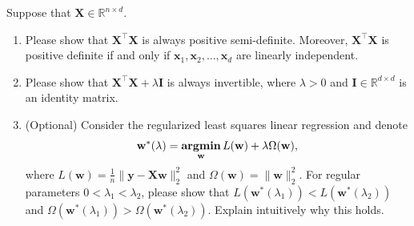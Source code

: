 \documentclass[11pt,letter,notitlepage]{article}
\DeclareMathOperator*{\argmin}{\bf argmin}
\begin{document}
	\newpage

	\begin{exercise}
		Suppose that $\mathbf{X}\in \mathbb{R}^{n\times d}$.
		\begin{enumerate}
			\item Please show that $\mathbf{X}^{\top}\mathbf{X}$ is always positive semi-definite. Moreover, $\mathbf{X}^{\top}\mathbf{X}$ is positive definite if and only if $\mathbf{x}_1, \mathbf{x}_2, \dots, \mathbf{x}_d$ are linearly independent.
			\item Please show that $\mathbf{X}^{\top}\mathbf{X} + \lambda \mathbf{I}$ is always invertible, where $\lambda>0$ and $\mathbf{I}\in \mathbb{R}^{d\times d}$ is an identity matrix.
			\item (Optional) Consider the regularized least squares linear regression and denote
			$$
			\mathbf{w}^*(\lambda)=\argmin_\mathbf{w} L(\mathbf{w})+\lambda \Omega(\mathbf{w}),
			$$
			where $L(\mathbf{w})=\frac{1}{n}\|\mathbf{y}-\mathbf{Xw}\|_2^2$ and $\Omega(\mathbf{w})=\|\mathbf{w}\|_2^2$. For regular parameters $0<\lambda_1<\lambda_2$, please show that $L(\mathbf{w}^*(\lambda_1)) < L(\mathbf{w}^*(\lambda_2))$ and $\Omega (\mathbf{w}^*(\lambda_1)) > \Omega (\mathbf{w}^*(\lambda_2))$. Explain intuitively why this holds.
		\end{enumerate}
		
		
	\end{exercise}

\newpage
\end{document}
